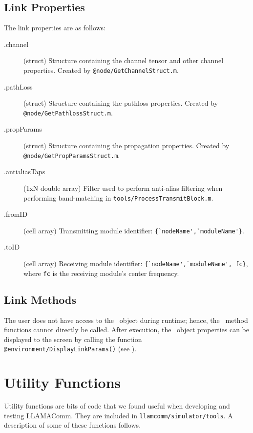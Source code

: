\subsection{Link Properties}
\label{sec:linkparams} \noindent The link properties are as follows:

\begin{description}
\item[.channel] (struct)  Structure containing the channel tensor and
other channel properties.  Created by
\verb+@node/GetChannelStruct.m+.

\item[.pathLoss] (struct) Structure containing the pathloss properties.
Created by \verb+@node/GetPathlossStruct.m+.

\item[.propParams] (struct) Structure containing the propagation
properties.  Created by \verb+@node/GetPropParamsStruct.m+.

\item[.antialiasTaps] (1xN double array) Filter used to perform anti-alias
filtering when performing band-matching in
\verb+tools/ProcessTransmitBlock.m+.

\item[.fromID] (cell array) Transmitting module identifier:
\verb+{`nodeName',`moduleName'}+.

\item[.toID] (cell array) Receiving module identifier:
\verb+{`nodeName',`moduleName', fc}+, where \verb+fc+ is the receiving module's
center frequency.

\end{description}

\subsection{Link Methods}

The user does not have access to the \link\ object during runtime;
hence, the \link\ method functions cannot directly be called.  After
execution, the \link\ object properties can be displayed to the
screen by calling the function
\verb+@environment/DisplayLinkParams()+ (see ).


\section{Utility Functions}

Utility functions are bits of code that we found useful when
developing and testing LLAMAComm.  They are included in
\verb+llamcomm/simulator/tools+.  A description of some of these
functions follows.

